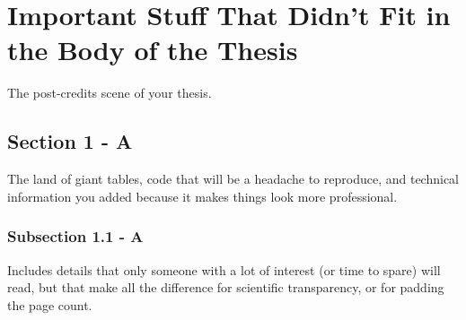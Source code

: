 %
%

\chapter{Important Stuff That Didn't Fit in the Body of the Thesis}\label{apen:apendiceA}

The post-credits scene of your thesis.

\section{Section 1 - A}

The land of giant tables, code that will be a headache to reproduce, and technical information you added because it makes things look more professional.

\subsection{Subsection 1.1 - A}

Includes details that only someone with a lot of interest (or time to spare) will read, but that make all the difference for scientific transparency, or for padding the page count.
